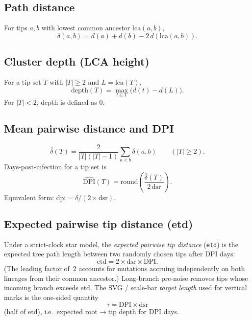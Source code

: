 \documentclass[11pt,a4paper]{article}
\begin{document}
\subsection{Path distance}
For tips $a,b$ with lowest common ancestor $\mathrm{lca}(a,b)$,
\[
  \delta(a,b)=d(a)+d(b)-2\,d(\mathrm{lca}(a,b)).
\]

\subsection{Cluster depth (LCA height)}
For a tip set $T$ with $|T|\ge 2$ and $L=\mathrm{lca}(T)$,
\[
  \mathrm{depth}(T)=\max_{t\in T}\bigl(d(t)-d(L)\bigr).
\]
For $|T|<2$, depth is defined as $0$.

\subsection{Mean pairwise distance and DPI}
\[
  \overline{\delta}(T)=\frac{2}{|T|(|T|-1)}\sum_{a<b}\delta(a,b)
  \qquad(|T|\ge 2).
\]
Days-post-infection for a tip set is
\begin{equation}
  \widehat{\mathrm{DPI}}(T)
  =\mathrm{round}\!\left(\frac{\overline{\delta}(T)}{2\,\mathrm{dsr}}\right).
  \label{eq:dpi}
\end{equation}
Equivalent form:
$\mathrm{dpi}=\overline{\delta}/(2\times\mathrm{dsr})$.

\subsection{Expected pairwise tip distance (etd)}
\label{sec:etd}
Under a strict-clock star model, the \emph{expected pairwise tip distance}
(\texttt{etd}) is the expected tree path length between two randomly chosen tips
after $\mathrm{DPI}$ days:
\begin{equation}
  \mathrm{etd}=2\times\mathrm{dsr}\times\mathrm{DPI}.
  \label{eq:etd}
\end{equation}
(The leading factor of~$2$ accounts for mutations accruing independently on both
lineages from their common ancestor.)
Long-branch pre-noise removes tips whose incoming branch exceeds $\mathrm{etd}$.
The SVG / scale-bar \emph{target length} used for vertical marks is the one-sided
quantity
\begin{equation}
  \tau=\mathrm{DPI}\times\mathrm{dsr}
  \label{eq:tau}
\end{equation}
(half of $\mathrm{etd}$), i.e.\ expected root$\to$tip depth for $\mathrm{DPI}$ days.
\end{document}
